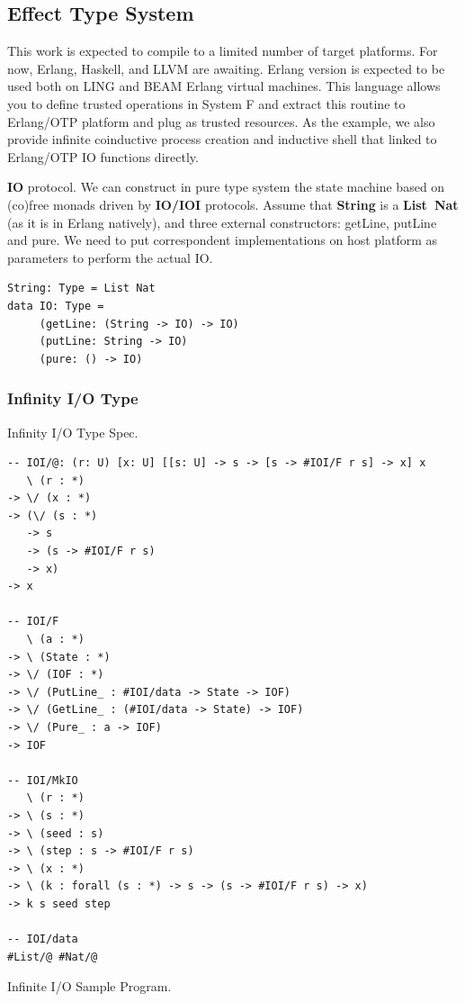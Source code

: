 \documentclass{aip-cp}
\begin{document}
\subsection{Effect Type System}
This work is expected to compile to a limited number of target platforms.
For now, Erlang, Haskell, and LLVM are awaiting.
Erlang version is expected to be used both on LING and BEAM Erlang virtual machines.
This language allows you to define trusted operations in System F and extract this routine to Erlang/OTP platform and plug as trusted resources.
As the example, we also provide infinite coinductive process creation and inductive shell that linked to Erlang/OTP IO functions directly.

{\bf IO} protocol.
We can construct in pure type system the state machine based on (co)free monads driven by {\bf IO/IOI} protocols.
Assume that {\bf String} is a {\bf List\ Nat} (as it is in Erlang natively), and three external constructors: getLine, putLine and pure.
We need to put correspondent implementations on host platform as parameters to perform the actual IO.

\begin{lstlisting}
String: Type = List Nat
data IO: Type =
     (getLine: (String -> IO) -> IO)
     (putLine: String -> IO)
     (pure: () -> IO)
\end{lstlisting}

\subsubsection{Infinity I/O Type}

Infinity I/O Type Spec.

\begin{lstlisting}
-- IOI/@: (r: U) [x: U] [[s: U] -> s -> [s -> #IOI/F r s] -> x] x
   \ (r : *)
-> \/ (x : *)
-> (\/ (s : *)
   -> s
   -> (s -> #IOI/F r s)
   -> x)
-> x

-- IOI/F
   \ (a : *)
-> \ (State : *)
-> \/ (IOF : *)
-> \/ (PutLine_ : #IOI/data -> State -> IOF)
-> \/ (GetLine_ : (#IOI/data -> State) -> IOF)
-> \/ (Pure_ : a -> IOF)
-> IOF

-- IOI/MkIO
   \ (r : *)
-> \ (s : *)
-> \ (seed : s)
-> \ (step : s -> #IOI/F r s)
-> \ (x : *)
-> \ (k : forall (s : *) -> s -> (s -> #IOI/F r s) -> x)
-> k s seed step

-- IOI/data
#List/@ #Nat/@
\end{lstlisting}

Infinite I/O Sample Program.
\end{document}
